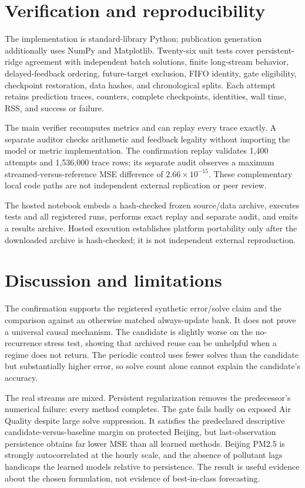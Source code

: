 \documentclass[10pt]{article}
\begin{document}
\section{Verification and reproducibility}
The implementation is standard-library Python; publication generation additionally uses NumPy and Matplotlib. Twenty-six unit tests cover persistent-ridge agreement with independent batch solutions, finite long-stream behavior, delayed-feedback ordering, future-target exclusion, FIFO identity, gate eligibility, checkpoint restoration, data hashes, and chronological splits. Each attempt retains prediction traces, counters, complete checkpoints, identities, wall time, RSS, and success or failure.

The main verifier recomputes metrics and can replay every trace exactly. A separate auditor checks arithmetic and feedback legality without importing the model or metric implementation. The confirmation replay validates 1,400 attempts and 1,536,000 trace rows; its separate audit observes a maximum streamed-versus-reference MSE difference of $2.66\times10^{-15}$. These complementary local code paths are not independent external replication or peer review.

The hosted notebook embeds a hash-checked frozen source/data archive, executes tests and all registered runs, performs exact replay and separate audit, and emits a results archive. Hosted execution establishes platform portability only after the downloaded archive is hash-checked; it is not independent external reproduction.

\section{Discussion and limitations}
The confirmation supports the registered synthetic error/solve claim and the comparison against an otherwise matched always-update bank. It does not prove a universal causal mechanism. The candidate is slightly worse on the no-recurrence stress test, showing that archived reuse can be unhelpful when a regime does not return. The periodic control uses fewer solves than the candidate but substantially higher error, so solve count alone cannot explain the candidate's accuracy.

The real streams are mixed. Persistent regularization removes the predecessor's numerical failure: every method completes. The gate fails badly on exposed Air Quality despite large solve suppression. It satisfies the predeclared descriptive candidate-versus-baseline margin on protected Beijing, but last-observation persistence obtains far lower MSE than all learned methods. Beijing PM2.5 is strongly autocorrelated at the hourly scale, and the absence of pollutant lags handicaps the learned models relative to persistence. The result is useful evidence about the chosen formulation, not evidence of best-in-class forecasting.
\end{document}
